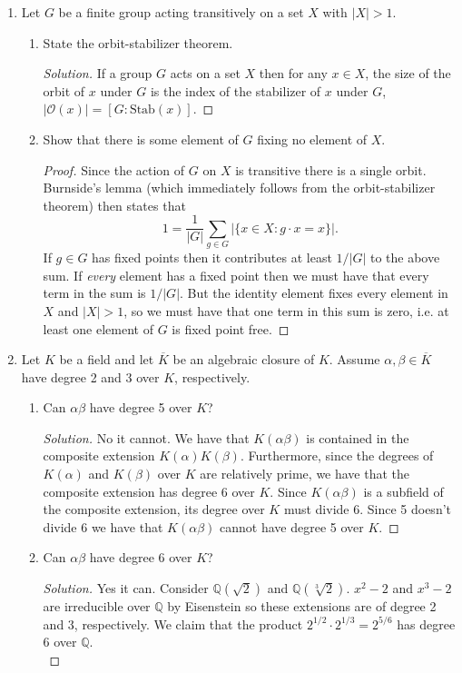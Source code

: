 \documentclass[11pt,letterpaper]{report}
\newcommand{\mcal}[1]{\mathcal{#1}}
\newcommand{\rationals}{\mathbb{Q}}
\newenvironment{solution}
{\begin{proof}[Solution]}
{\end{proof}}
\begin{document}
\begin{enumerate}
	\item Let $G$ be a finite group acting transitively on a set $X$ with $|X|>1$.
	\begin{enumerate}
		\item State the orbit-stabilizer theorem.
		\begin{solution}
			If a group $G$ acts on a set $X$ then for any $x\in X$, the size of the orbit of $x$ under $G$ is the index of the stabilizer of $x$ under $G$, $|\mcal{O}(x)| = [G: \text{Stab}(x)]$.
		\end{solution}
		\item Show that there is some element of $G$ fixing no element of $X$.
		\begin{proof}
			Since the action of $G$ on $X$ is transitive there is a single orbit. Burnside's lemma (which immediately follows from the orbit-stabilizer theorem) then states that
			\[
			1 = \frac{1}{|G|}\sum_{g\in G}|\{x\in X: g\cdot x = x\}|.
			\]
			If $g\in G$ has fixed points then it contributes at least $1/|G|$ to the above sum. If \textit{every} element has a fixed point then we must have that every term in the sum is $1/|G|$. But the identity element fixes every element in $X$ and $|X|>1$, so we must have that one term in this sum is zero, i.e. at least one element of $G$ is fixed point free.
		\end{proof}
	\end{enumerate}

	\item Let $K$ be a field and let $\overline{K}$ be an algebraic closure of $K$. Assume $\alpha,\beta\in \overline{K}$ have degree 2 and 3 over $K$, respectively.
	\begin{enumerate}
		\item Can $\alpha\beta$ have degree 5 over $K$?
		\begin{solution}
			No it cannot. We have that $K(\alpha\beta)$ is contained in the composite extension $K(\alpha)K(\beta)$. Furthermore, since the degrees of $K(\alpha)$ and $K(\beta)$ over $K$ are relatively prime, we have that the composite extension has degree 6 over $K$. Since $K(\alpha\beta)$ is a subfield of the composite extension, its degree over $K$ must divide 6. Since 5 doesn't divide 6 we have that $K(\alpha\beta)$ cannot have degree 5 over $K$.
		\end{solution}
		\item Can $\alpha\beta$ have degree 6 over $K$?
		\begin{solution}
			Yes it can. Consider $\rationals(\sqrt{2})$ and $\rationals(\sqrt[3]{2})$. $x^2-2$ and $x^3-2$ are irreducible over $\rationals$ by Eisenstein so these extensions are of degree 2 and 3, respectively. We claim that the product $2^{1/2}\cdot 2^{1/3} = 2^{5/6}$ has degree 6 over $\rationals$.\\


\end{solution}
\end{enumerate}
\end{enumerate}
\end{document}
